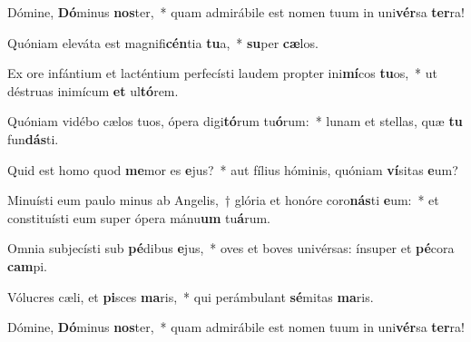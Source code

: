 \item Dómine, \textbf{Dó}minus \textbf{nos}ter,~* quam admirábile est nomen tuum in uni\textbf{vér}sa \textbf{ter}ra!
\item Quóniam eleváta est magnifi\textbf{cén}tia \textbf{tu}a,~* \textbf{su}per \textbf{cæ}los.
\item Ex ore infántium et lacténtium perfecísti laudem propter ini\textbf{mí}cos \textbf{tu}os,~* ut déstruas inimícum \textbf{et} ul\textbf{tó}rem.
\item Quóniam vidébo cælos tuos, ópera digi\textbf{tó}rum tu\textbf{ó}rum:~* lunam et stellas, quæ \textbf{tu} fun\textbf{dás}ti.
\item Quid est homo quod \textbf{me}mor es \textbf{e}jus?~* aut fílius hóminis, quóniam \textbf{ví}sitas \textbf{e}um?
\item Minuísti eum paulo minus ab Angelis,~† glória et honóre coro\textbf{nás}ti \textbf{e}um:~* et constituísti eum super ópera mánu\textbf{um} tu\textbf{á}rum.
\item Omnia subjecísti sub \textbf{pé}dibus \textbf{e}jus,~* oves et boves univérsas: ínsuper et \textbf{pé}cora \textbf{cam}pi.
\item Vólucres cæli, et \textbf{pi}sces \textbf{ma}ris,~* qui perámbulant \textbf{sé}mitas \textbf{ma}ris.
\item Dómine, \textbf{Dó}minus \textbf{nos}ter,~* quam admirábile est nomen tuum in uni\textbf{vér}sa \textbf{ter}ra!
